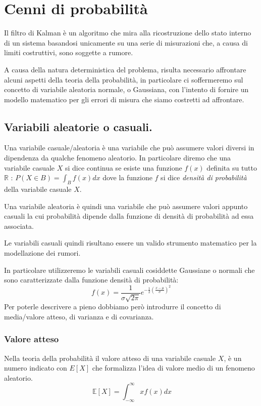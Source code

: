 \section{Cenni di probabilità}

Il filtro di Kalman è un algoritmo che mira alla ricostruzione dello stato interno di un sistema basandosi unicamente su una serie di misurazioni che, a causa di limiti costruttivi, sono soggette a rumore.

A causa della natura deterministica del problema, risulta necessario affrontare alcuni aspetti della teoria della probabilità, in particolare ci soffermeremo sul concetto di variabile aleatoria normale, o Gaussiana, con l'intento di fornire un modello matematico per gli errori di misura che siamo costretti ad affrontare.

\subsection{Variabili aleatorie o casuali.}

Una variabile casuale/aleatoria è una variabile che può assumere valori diversi in dipendenza da qualche fenomeno aleatorio.
In particolare diremo che una variabile casuale $X$ si dice continua se esiste una funzione $f(x)$ definita su tutto $\mathbb{R}$ : $P(X \in B) = \int_B f(x) dx$ dove la funzione $f$ si dice \textit{densità di probabilità} della variabile casuale $X$.

Una variabile aleatoria è quindi una variabile che può assumere valori appunto casuali la cui probabilità dipende dalla funzione di densità di probabilità ad essa associata. 

Le variabili casuali quindi risultano essere un valido strumento matematico per la modellazione dei rumori.

In particolare utilizzeremo le variabili casuali cosiddette Gaussiane o normali che sono caratterizzate dalla funzione densità di probabilità: \[f(x) = \frac{1}{{\sigma \sqrt {2\pi } }}e^{-\frac{1}{2}{(\frac{x-\mu}{\sigma})}^2}\] Per poterle descrivere a pieno dobbiamo però introdurre il concetto di media/valore atteso, di varianza e di covarianza.

\subsubsection{Valore atteso}

Nella teoria della probabilità il valore atteso di una variabile casuale $X$, è un numero indicato con $E[X]$ che formalizza l'idea di valore medio di un fenomeno aleatorio.
\[\ {\mathbb  {E}}[X]=\int _{{-\infty }}^{{\infty }}xf(x)dx\]

